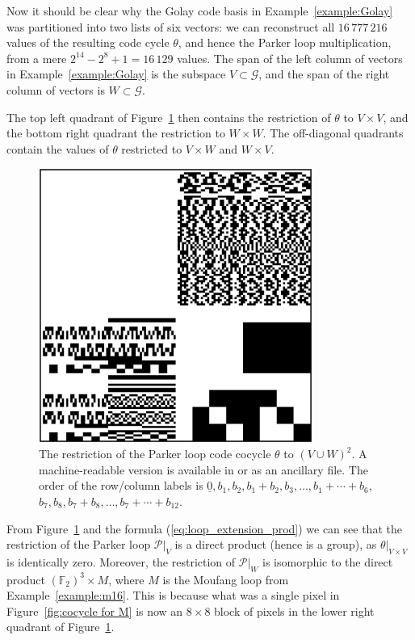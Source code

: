 \documentclass{article}
\theoremstyle{plain}
\theoremstyle{definition}
\def \cG {\mathcal{G}}
\def \cP {\mathcal{P}}
\def \FF {\mathbb{F}}
\begin{document}
Now it should be clear why the Golay code basis in Example~\ref{example:Golay} was partitioned into two lists of six vectors: we can reconstruct all $16\,777\,216$ values of the resulting code cycle $\theta$, and hence the Parker loop multiplication, from a mere $2^{14} - 2^8 + 1 = 16\,129$ values.
The span of the left column of vectors in Example~\ref{example:Golay} is the subspace $V\subset \cG$, and the span of the right column of vectors is $W\subset \cG$.

The top left quadrant of Figure~\ref{fig:Parker cocycle} then contains the restriction of $\theta$ to $V\times V$, and the bottom right quadrant the restriction to $W\times W$. 
The off-diagonal quadrants contain the values of $\theta$ restricted to $V\times W$ and $W\times V$.

\begin{figure}[ht]
\begin{center}
\includegraphics[width=0.8\textwidth]{alpha_awesum.png}
\end{center}
\caption{The restriction of the Parker loop code cocycle $\theta$ to $(V\cup W)^2$. A machine-readable version is available in \cite{RN_GH} or as an %
ancillary file. The order of the row/column labels is $\underline{0},b_1,b_2,b_1+b_2,b_3,\ldots, b_1+\cdots +b_6$, $b_7,b_8,b_7+b_8,\ldots,b_7+\cdots + b_{12}$.}
\label{fig:Parker cocycle}
\end{figure}

From Figure~\ref{fig:Parker cocycle} and the formula (\ref{eq:loop_extension_prod}) we can see that the restriction of the Parker loop $\cP\big|_V$ is a direct product (hence is a group), as $\theta\big|_{V\times V}$ is identically zero. 
Moreover, the restriction of $\cP\big|_W$ is isomorphic to the direct product $(\FF_2)^3 \times M$, where $M$ is the Moufang loop from Example~\ref{example:m16}.
This is because what was a single pixel in Figure~\ref{fig:cocycle for M} is now an $8\times 8$ block of pixels in the lower right quadrant of Figure~\ref{fig:Parker cocycle}.
\end{document}
